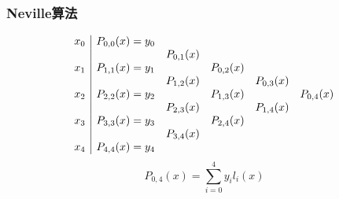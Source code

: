 \documentclass[red,compress]{beamer}
\begin{document}
\begin{frame}
\frametitle{Neville算法}
\begin{equation*}
\begin{array}{r|*{5}c}
x_0 & P_{0,0}(x)=y_0 &            &            &            & \\
    &                & P_{0,1}(x) &            &            & \\
x_1 & P_{1,1}(x)=y_1 &            & P_{0,2}(x) &            & \\
    &                & P_{1,2}(x) &            & P_{0,3}(x) & \\
x_2 & P_{2,2}(x)=y_2 &            & P_{1,3}(x) &            & P_{0,4}(x) \\
    &                & P_{2,3}(x) &            & P_{1,4}(x) & \\
x_3 & P_{3,3}(x)=y_3 &            & P_{2,4}(x) &            & \\
    &                & P_{3,4}(x) &            &            & \\
x_4 & P_{4,4}(x)=y_4 &            &            &            &
\end{array}
\end{equation*}
\begin{equation*}
P_{0,4}(x)=\sum_{i=0}^{4}y_il_i(x)
\end{equation*}
\end{frame}
\end{document}
